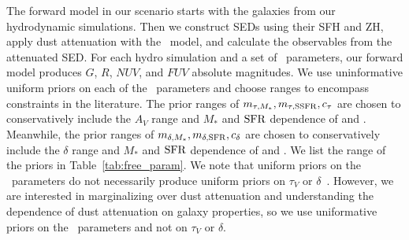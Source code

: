 The forward model in our scenario starts with the galaxies from our
hydrodynamic simulations. Then we construct SEDs using their SFH and ZH,
apply dust attenuation with the \eda~model, and calculate the observables from
the attenuated SED. For each hydro simulation and a set of \eda~parameters, our forward model
produces $G$, $R$, $NUV$, and $FUV$ absolute magnitudes. We use uninformative uniform priors on each of
the \eda~parameters and choose ranges to encompass constraints in the
literature. The prior ranges of $m_{\tau,M_*}, m_{\tau,{\rm SSFR}}, c_\tau$ are chosen to
conservatively include the $A_V$ range and $M_*$ and ${\rm SFR}$ dependence of
\cite{narayanan2018} and \cite{salim2020}. Meanwhile, the prior ranges of 
$m_{\delta,M_*}, m_{\delta,{\rm SFR}}, c_\delta$ are chosen to conservatively include the $\delta$
range and $M_*$ and ${\rm SFR}$ dependence of \cite{leja2017} and \cite{salim2018}. 
We list the range of the priors in Table~\ref{tab:free_param}. We note that
uniform priors on the \eda~parameters do not necessarily produce uniform priors 
on $\tau_V$ or $\delta$~\citep[\eg][]{handley2019}. However, we are interested in
marginalizing over dust attenuation and understanding the dependence of dust
attenuation on galaxy properties, so we use uniformative priors on the
\eda~parameters and not on $\tau_V$ or $\delta$. 

